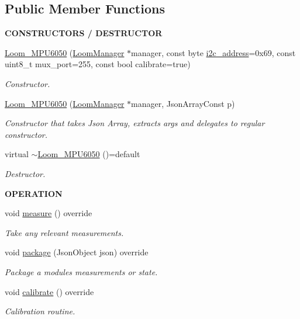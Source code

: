 \subsection*{Public Member Functions}
\begin{Indent}{\bf C\+O\+N\+S\+T\+R\+U\+C\+T\+O\+RS / D\+E\+S\+T\+R\+U\+C\+T\+OR}\par
\begin{DoxyCompactItemize}
\item 
\hyperlink{class_loom___m_p_u6050_a433ac12fae38672cfd0bdb19d142d213}{Loom\+\_\+\+M\+P\+U6050} (\hyperlink{class_loom_manager}{Loom\+Manager} $\ast$manager, const byte \hyperlink{class_loom_i2_c_sensor_a6ff389c1f015152a9ebfccb037d3d90e}{i2c\+\_\+address}=0x69, const uint8\+\_\+t mux\+\_\+port=255, const bool calibrate=true)
\begin{DoxyCompactList}\small\item\em Constructor. \end{DoxyCompactList}\item 
\hyperlink{class_loom___m_p_u6050_a680544122c36712c5b0fe908a284f6b1}{Loom\+\_\+\+M\+P\+U6050} (\hyperlink{class_loom_manager}{Loom\+Manager} $\ast$manager, Json\+Array\+Const p)
\begin{DoxyCompactList}\small\item\em Constructor that takes Json Array, extracts args and delegates to regular constructor. \end{DoxyCompactList}\item 
virtual \hyperlink{class_loom___m_p_u6050_a7f416a3e5884ff71537608580259c1c0}{$\sim$\+Loom\+\_\+\+M\+P\+U6050} ()=default
\begin{DoxyCompactList}\small\item\em Destructor. \end{DoxyCompactList}\end{DoxyCompactItemize}
\end{Indent}
\begin{Indent}{\bf O\+P\+E\+R\+A\+T\+I\+ON}\par
\begin{DoxyCompactItemize}
\item 
void \hyperlink{class_loom___m_p_u6050_ab2e0dc418e3ba9d0a4bb2098f204e46a}{measure} () override
\begin{DoxyCompactList}\small\item\em Take any relevant measurements. \end{DoxyCompactList}\item 
void \hyperlink{class_loom___m_p_u6050_a053f5fd6c8e4d8bc3243f345d68d0f30}{package} (Json\+Object json) override
\begin{DoxyCompactList}\small\item\em Package a modules measurements or state. \end{DoxyCompactList}\item 
void \hyperlink{class_loom___m_p_u6050_a56d731f0e63bbb4c00c12dab2b785d61}{calibrate} () override
\begin{DoxyCompactList}\small\item\em Calibration routine. \end{DoxyCompactList}\end{DoxyCompactItemize}
\end{Indent}
